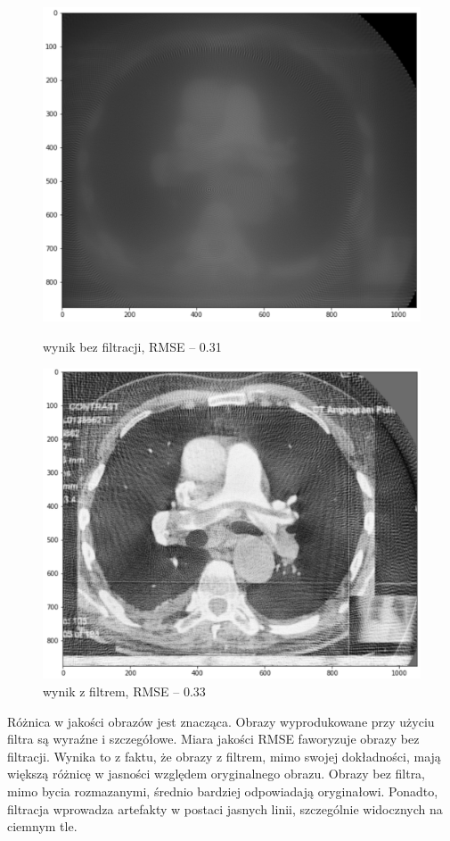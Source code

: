 \documentclass[polish,polish,a4paper]{article}
\begin{document}
			\begin{figure}[!h]
				\centering
				\begin{minipage}{0.45\linewidth}
					\includegraphics[width=\linewidth]{img/saddle_nf.png}
					\caption{wynik bez filtracji, RMSE -- 0.31}
				\end{minipage}
				\hfill
				\begin{minipage}{0.45\linewidth}
					\includegraphics[width=\linewidth]{img/saddle_f.png}
					\caption{wynik z filtrem, RMSE -- 0.33}
				\end{minipage}
			\end{figure}
			
			Różnica w jakości obrazów jest znacząca. 
			Obrazy wyprodukowane przy użyciu filtra są wyraźne i szczegółowe. 
			Miara jakości RMSE faworyzuje obrazy bez filtracji. 
			Wynika to z faktu, że obrazy z filtrem, mimo swojej dokładności, 
			mają większą różnicę w jasności względem oryginalnego obrazu. 
			Obrazy bez filtra, mimo bycia rozmazanymi, 
			średnio bardziej odpowiadają oryginałowi. 
			Ponadto, filtracja wprowadza artefakty w postaci jasnych linii, 
			szczególnie widocznych na ciemnym tle.
			
\end{document}
